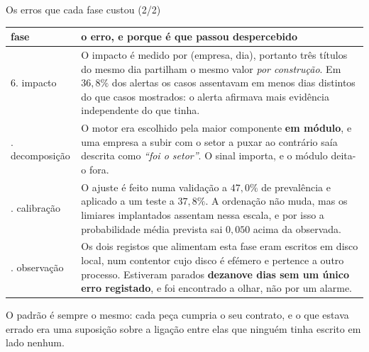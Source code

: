 \documentclass[aspectratio=169]{beamer}
\begin{document}
\begin{frame}{Os erros que cada fase custou (2/2)}
\vspace{2mm}
{\scriptsize
\begin{tabular}{@{}p{}p{}@{}}
\toprule
\textbf{fase} & \textbf{o erro, e porque é que passou despercebido} \\
\midrule
6. impacto & O impacto é medido por (empresa, dia), portanto três títulos do mesmo dia partilham
o mesmo valor \emph{por construção}. Em $36{,}8\%$ dos alertas os casos assentavam em menos dias
distintos do que casos mostrados: o alerta afirmava mais evidência independente do que tinha. \\
\addlinespace
7. decomposição & O motor era escolhido pela maior componente \textbf{em módulo}, e uma empresa
a subir com o setor a puxar ao contrário saía descrita como \emph{``foi o setor''}. O sinal
importa, e o módulo deita-o fora. \\
\addlinespace
9. calibração & O ajuste é feito numa validação a $47{,}0\%$ de prevalência e aplicado a um teste a
$37{,}8\%$. A ordenação não muda, mas os limiares implantados assentam nessa escala, e por isso a
probabilidade média prevista sai $0{,}050$ acima da observada. \\
\addlinespace
10. observação & Os dois registos que alimentam esta fase eram escritos em disco local, num
contentor cujo disco é efémero e pertence a outro processo. Estiveram parados
\textbf{dezanove dias sem um único erro registado}, e foi encontrado a olhar, não por um alarme. \\
\bottomrule
\end{tabular}}
\vspace{3mm}

\begin{center}\footnotesize
O padrão é sempre o mesmo: cada peça cumpria o seu contrato, e o que estava errado era uma
suposição sobre a ligação entre elas que ninguém tinha escrito em lado nenhum.
\end{center}
\end{frame}
\end{document}
